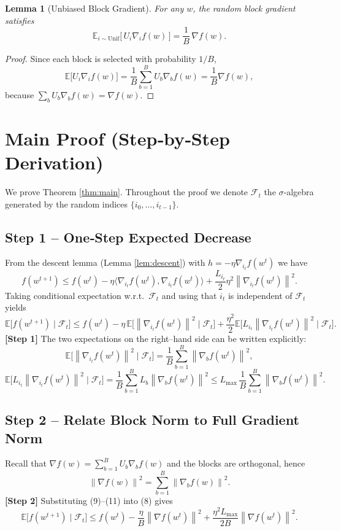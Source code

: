 \documentclass{article}
\newtheorem{lemma}{Lemma}
\newcommand{\E}{\mathbb{E}}
\newcommand{\norm}[1]{\left\lVert#1\right\rVert}
\begin{document}
\begin{lemma}[Unbiased Block Gradient]\label{lem:unbiased}
For any $w$, the random block gradient satisfies
\[
\E_{i\sim\text{Unif}}\!\bigl[\,U_{i}\nabla_{i}f(w)\,\bigr]
=\frac{1}{B}\,\nabla f(w).
\tag{6}
\]
\end{lemma}
\begin{proof}
Since each block is selected with probability $1/B$,
\[
\E\!\bigl[U_{i}\nabla_{i}f(w)\bigr]
=\frac{1}{B}\sum_{b=1}^{B}U_{b}\nabla_{b}f(w)
=\frac{1}{B}\nabla f(w),
\]
because $\sum_{b}U_{b}\nabla_{b}f(w)=\nabla f(w)$. \qedhere
\end{proof}

\section*{Main Proof (Step‑by‑Step Derivation)}
We prove Theorem \ref{thm:main}. Throughout the proof we denote
$\mathcal{F}_{t}$ the $\sigma$‑algebra generated by the random indices
$\{i_{0},\dots ,i_{t-1}\}$.

\subsection*{Step 1 – One‑Step Expected Decrease}
From the descent lemma (Lemma \ref{lem:descent}) with $h=-\eta\nabla_{i_{t}}f(w^{t})$ we have
\[
f\!\left(w^{t+1}\right)
\le f\!\left(w^{t}\right)
-\eta\bigl\langle\nabla_{i_{t}}f(w^{t}),\nabla_{i_{t}}f(w^{t})\bigr\rangle
+\frac{L_{i_{t}}}{2}\eta^{2}\norm{\nabla_{i_{t}}f(w^{t})}^{2}.
\tag{7}
\]
Taking conditional expectation w.r.t.\ $\mathcal{F}_{t}$ and using that $i_{t}$ is
independent of $\mathcal{F}_{t}$ yields
\[
\E\!\bigl[f(w^{t+1})\mid\mathcal{F}_{t}\bigr]
\le f(w^{t})
-\eta\,\E\!\bigl[\norm{\nabla_{i_{t}}f(w^{t})}^{2}\mid\mathcal{F}_{t}\bigr]
+\frac{\eta^{2}}{2}\E\!\bigl[L_{i_{t}}\norm{\nabla_{i_{t}}f(w^{t})}^{2}\mid\mathcal{F}_{t}\bigr].
\tag{8}
\]
\textbf{[Step 1]} The two expectations on the right–hand side can be written explicitly:
\[
\E\!\bigl[\norm{\nabla_{i_{t}}f(w^{t})}^{2}\mid\mathcal{F}_{t}\bigr]
=\frac{1}{B}\sum_{b=1}^{B}\norm{\nabla_{b}f(w^{t})}^{2},
\tag{9}
\]
\[
\E\!\bigl[L_{i_{t}}\norm{\nabla_{i_{t}}f(w^{t})}^{2}\mid\mathcal{F}_{t}\bigr]
=\frac{1}{B}\sum_{b=1}^{B}L_{b}\norm{\nabla_{b}f(w^{t})}^{2}
\le L_{\max}\,\frac{1}{B}\sum_{b=1}^{B}\norm{\nabla_{b}f(w^{t})}^{2}.
\tag{10}
\]

\subsection*{Step 2 – Relate Block Norm to Full Gradient Norm}
Recall that $\nabla f(w)=\sum_{b=1}^{B}U_{b}\nabla_{b}f(w)$ and the blocks are orthogonal,
hence
\[
\norm{\nabla f(w)}^{2}
=\sum_{b=1}^{B}\norm{\nabla_{b}f(w)}^{2}.
\tag{11}
\]
\textbf{[Step 2]} Substituting (9)–(11) into (8) gives
\[
\E\!\bigl[f(w^{t+1})\mid\mathcal{F}_{t}\bigr]
\le f(w^{t})-\frac{\eta}{B}\norm{\nabla f(w^{t})}^{2}
+\frac{\eta^{2}L_{\max}}{2B}\norm{\nabla f(w^{t})}^{2}.
\tag{12}
\]
\end{document}
